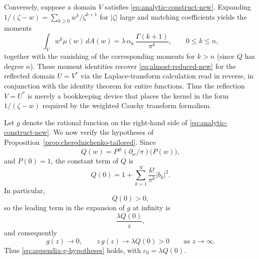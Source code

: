 \documentclass[a4paper,11pt,reqno]{amsart}
\numberwithin{equation}{section}
\theoremstyle{plain} %
\theoremstyle{definition} %
\theoremstyle{remark}
\begin{document}
Conversely, suppose a domain $V$ satisfies \eqref{eq:analytic-construct-new}. Expanding $1/(\zeta-w)=\sum_{k\ge 0}w^k/\zeta^{k+1}$ for $|\zeta|$ large and matching coefficients yields the moments
\[
\int_V w^k\mu(w)\,dA(w)=\lambda\,\alpha_k\,\frac{\Gamma(k+1)}{\pi^k},
\qquad 0\le k\le n,
\]
together with the vanishing of the corresponding moments for $k>n$ (since $Q$ has degree $n$). These moment identities recover \eqref{eq:almost-reduced-new} for the reflected domain \(U=V^\ast\) via the Laplace-transform calculation read in reverse, in conjunction with the identity theorem for entire functions. Thus the reflection \(V=U^\ast\) is merely a bookkeeping device that places the kernel in the form $1/(\zeta-w)$ required by the weighted Cauchy transform formalism.

Let $g$ denote the rational function on the right-hand side of \eqref{eq:analytic-construct-new}. We now verify the hypotheses of Proposition~\ref{prop:cherednichenko-tailored}. Since
\[
Q(w)=P^\#(\partial_w/\pi)\big(P(w)\big),
\]
and $P(0)=1$, the constant term of $Q$ is
\[
Q(0)=1+\sum_{k=1}^N \frac{k!}{\pi^k}|b_k|^2.
\]
In particular,
\[
Q(0)>0,
\]
so the leading term in the expansion of $g$ at infinity is
\[
\frac{\lambda Q(0)}{z},
\]
and consequently
\[
g(z)\to 0,
\qquad
z\,g(z)\to \lambda Q(0)>0
\qquad \text{as } z\to\infty.
\]
Thus \eqref{eq:appendix-g-hypotheses} holds, with $c_0=\lambda Q(0)$.
\end{document}
